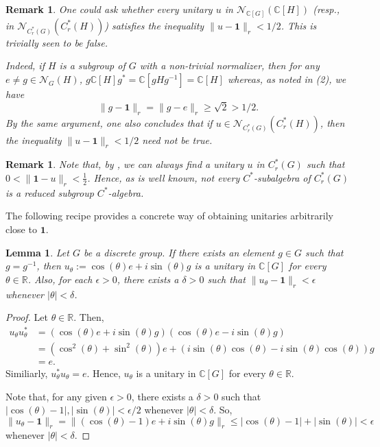 \documentclass{amsart}
\numberwithin{equation}{section}
\newcommand{\R}{\mathbb R}
\newcommand{\C}{\mathbb C}
\newcommand{\1}{\mathbf{1}}
\newtheorem{lemma}[theorem]{Lemma}
\newtheorem{remark}[theorem]{Remark}
\begin{document}
\begin{remark}
One could ask whether every unitary $u $ in
$\mathcal{N}_{\C[G]}(\C[H])$ (resp., in
$\mathcal{N}_{C^*_r(G)}(C^*_r(H))$) satisfies the inequality $\|u -
\1\|_r < 1/2$. This is trivially seen to be false.

Indeed, if $H$ is a subgroup of $G$ with a non-trivial normalizer,
then for any $e \neq g \in \mathcal{N}_G(H)$, $g \C[H]g^* = \C [g
  Hg^{-1}] = \C[H]$ whereas, as noted in (2), we have
\[
\|g - \1\|_r = \|g - e\|_r \geq \sqrt{2} > 1/2.
\]
By the same argument, one also concludes that if $u \in
\mathcal{N}_{C^*_r(G)}(C^*_r(H))$, then the inequality $\|u - \1\|_r<
1/2$ need not be true.
\end{remark}

\begin{remark} 
Note that, by , we can always find a unitary $u$
in $C^*_r(G)$ such that $0< \|\1- u\|_r< \frac{1}{2}$. Hence, as is well
known, not every $C^{*}$-subalgebra of $C^*_r(G)$ is a reduced
subgroup $C^*$-algebra.
\end{remark}
The following recipe provides a concrete way of obtaining unitaries
arbitrarily close to $\1$.
\begin{lemma}\label{u-theta}
Let $G$ be a discrete group. If there exists an element $g \in G$ such
that $g=g^{-1}$, then $u_{\theta}:=\cos(\theta) e + i \sin (\theta) g$
is a unitary in $\C[G]$ for every $\theta \in \R$. Also, for each
$\epsilon > 0$, there exists a $\delta > 0$ such that $\|u_\theta -
\1\|_r < \epsilon$ whenever $|\theta| < \delta$.
\end{lemma}
\begin{proof}
Let $\theta \in \R$. Then,
\begin{align*}
u_{\theta}u_{\theta}^{*}&= (\cos(\theta) e + i \sin (\theta) g)
(\cos(\theta) e - i \sin (\theta) g)\\ &=(\cos^2(\theta) + \sin^2
(\theta)) e + (i \sin(\theta)\cos(\theta)- i\sin(\theta)\cos(\theta))
g \\ &= e.
\end{align*} 
 Similiarly, $u_{\theta}^{*}u_{\theta}= e$.  Hence, $u_{\theta}$ is a
 unitary in $\C[G]$ for every $\theta \in \R$.

Note that, for any given $\epsilon > 0$, there exists a $\delta > 0$
such that $|\cos(\theta) - 1|, |\sin (\theta)|< \epsilon/2$ whenever
$|\theta| < \delta$. So,
 \[
 \|u_\theta -\1 \|_r = \|(\cos(\theta)-1)e + i \sin (\theta) g\|_r  \leq |\cos(\theta)-1| + |\sin(\theta)| < \epsilon
 \]
whenever $|\theta| < \delta$. 
\end{proof}
\end{document}
